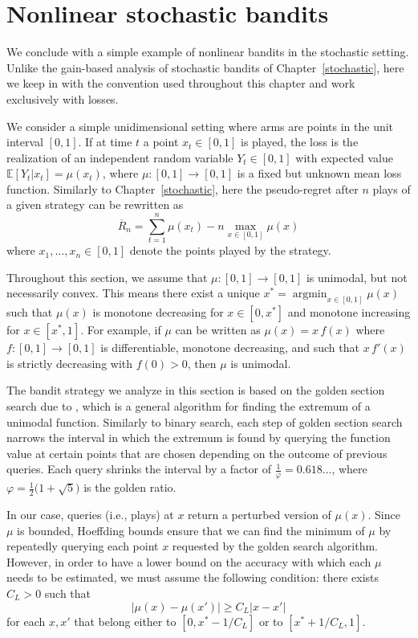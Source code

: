 \documentclass[11pt]{hackednow}
\newcommand{\E}{\mathbb{E}}
\newcommand{\oR}{\overline{R}}
\newcommand{\argmin}{\mathop{\mathrm{argmin}}}
\begin{document}
\section{Nonlinear stochastic bandits}
\label{s:nonlinear-stochastic}
We conclude with a simple example of nonlinear bandits in the stochastic setting. Unlike the gain-based analysis of stochastic bandits of Chapter~\ref{stochastic}, here we keep in with the convention used throughout this chapter and work exclusively with losses.

We consider a simple unidimensional setting where arms are points in the unit interval $[0,1]$. If at time $t$ a point $x_t \in [0,1]$ is played, the loss is the realization of an independent random variable $Y_t\in [0,1]$ with expected value $\E[Y_t | x_t] = \mu(x_t)$, where $\mu : [0,1]\to [0,1]$ is a fixed but unknown mean loss function. Similarly to Chapter~\ref{stochastic}, here the pseudo-regret after $n$ plays of a given strategy can be rewritten as
\[
    \oR_n = \sum_{t=1}^n \mu(x_t) - n\max_{x\in [0,1]}\mu(x)
\]
where $x_1,\dots,x_n \in [0,1]$ denote the points played by the strategy.

Throughout this section, we assume that $\mu : [0,1] \to [0,1]$ is unimodal, but not necessarily convex. This means there exist a unique $x^* = \argmin_{x \in [0,1]} \mu(x)$ such that $\mu(x)$ is monotone decreasing for $x \in [0,x^*]$ and monotone increasing for $x \in [x^*,1]$. For example, if $\mu$ can be written as $\mu(x) = x\,f(x)$ where $f : [0,1] \to [0,1]$ is differentiable, monotone decreasing, and such that $x\,f'(x)$ is strictly decreasing with $f(0) > 0$, then $\mu$ is unimodal.

The bandit strategy we analyze in this section is based on the golden section search due to \cite{kiefer1953sequential}, which is a general algorithm for finding the extremum of a unimodal function. Similarly to binary search, each step of golden section search narrows the interval in which the extremum is found by querying the function value at certain points that are chosen depending on the outcome of previous queries. Each query shrinks the interval by a factor of $\tfrac{1}{\varphi} = 0.618\dots$, where $\varphi =  \tfrac{1}{2}\bigl(1 + \sqrt{5}\bigr)$ is the golden ratio.

In our case, queries (i.e., plays) at $x$ return a perturbed version of $\mu(x)$. Since $\mu$ is bounded, Hoeffding bounds ensure that we can find the minimum of $\mu$ by repeatedly querying each point $x$ requested by the golden search algorithm. However, in order to have a lower bound on the accuracy with which each $\mu$ needs to be estimated, we must assume the following condition: there exists $C_L > 0$ such that
\begin{equation}
\label{eq:strongmax}
    \bigl|\mu(x)-\mu(x')\bigr| \ge C_L|x-x'|
\end{equation}
for each $x,x'$ that belong either to $[0,x^*-1/C_L]$ or to $[x^*+1/C_L,1]$.
\end{document}
